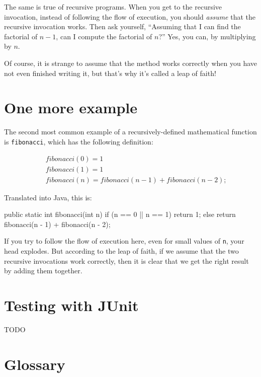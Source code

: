 \documentclass[12pt]{book}
\begin{document}
The same is true of recursive programs.
When you get to the recursive invocation, instead of following the flow of execution, you should {\em assume} that the recursive invocation works.
Then ask yourself, ``Assuming that I can find the factorial of $n-1$, can I compute the factorial of $n$?''
Yes, you can, by multiplying by $n$.

Of course, it is strange to assume that the method works correctly when you have not even finished writing it, but that's why it's called a leap of faith!


\section{One more example}
\label{fibonacci}


The second most common example of a recursively-defined mathematical function is {\tt fibonacci}, which has the following definition:

\begin{eqnarray*}
&& fibonacci(0) = 1 \\
&& fibonacci(1) = 1 \\
&& fibonacci(n) = fibonacci(n-1) + fibonacci(n-2);
\end{eqnarray*}

Translated into Java, this is:

\begin{code}
    public static int fibonacci(int n) {
        if (n == 0 || n == 1) {
            return 1;
        } else {
            return fibonacci(n - 1) + fibonacci(n - 2);
        }
    }
\end{code}

If you try to follow the flow of execution here, even for small values of {\tt n}, your head explodes.
But according to the leap of faith, if we assume that the two recursive invocations work correctly, then it is clear that we get the right result by adding them together.


\section{Testing with JUnit}
TODO


\section{Glossary}
\end{document}
